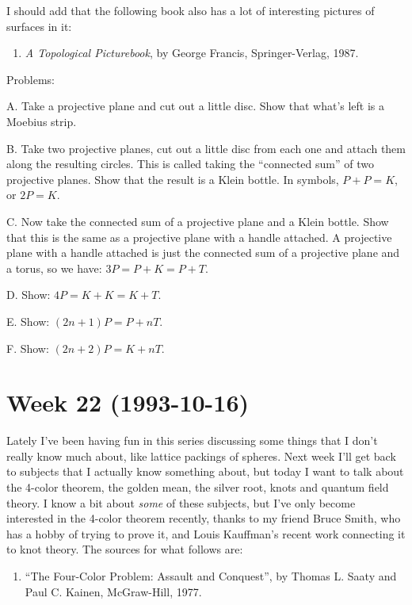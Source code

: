 \documentclass{article}
\def\tightlist{}
\begin{document}
I should add that the following book also has a lot of interesting
pictures of surfaces in it:

\begin{enumerate}
\def\labelenumi{\arabic{enumi})}
\setcounter{enumi}{2}
\tightlist
\item
  \emph{A Topological Picturebook}, by George Francis, Springer-Verlag,
  1987.
\end{enumerate}

Problems:

A. Take a projective plane and cut out a little disc. Show that what's
left is a Moebius strip.

B. Take two projective planes, cut out a little disc from each one and
attach them along the resulting circles. This is called taking the
``connected sum'' of two projective planes. Show that the result is a
Klein bottle. In symbols, \(P + P = K\), or \(2P = K\).

C. Now take the connected sum of a projective plane and a Klein bottle.
Show that this is the same as a projective plane with a handle attached.
A projective plane with a handle attached is just the connected sum of a
projective plane and a torus, so we have: \(3P = P + K = P + T\).

D. Show: \(4P = K + K = K + T\).

E. Show: \((2n+1)P = P + nT\).

F. Show: \((2n+2)P = K + nT\).
\hypertarget{week-22-1993-10-16}{%
\section{Week 22 (1993-10-16)}\label{week-22-1993-10-16}}

Lately I've been having fun in this series discussing some things that I
don't really know much about, like lattice packings of spheres. Next
week I'll get back to subjects that I actually know something about, but
today I want to talk about the 4-color theorem, the golden mean, the
silver root, knots and quantum field theory. I know a bit about
\emph{some} of these subjects, but I've only become interested in the
4-color theorem recently, thanks to my friend Bruce Smith, who has a
hobby of trying to prove it, and Louis Kauffman's recent work connecting
it to knot theory. The sources for what follows are:

\begin{enumerate}
\def\labelenumi{\arabic{enumi})}
\tightlist
\item
  ``The Four-Color Problem: Assault and Conquest'', by Thomas L. Saaty
  and Paul C. Kainen, McGraw-Hill, 1977.
\end{enumerate}
\end{document}
